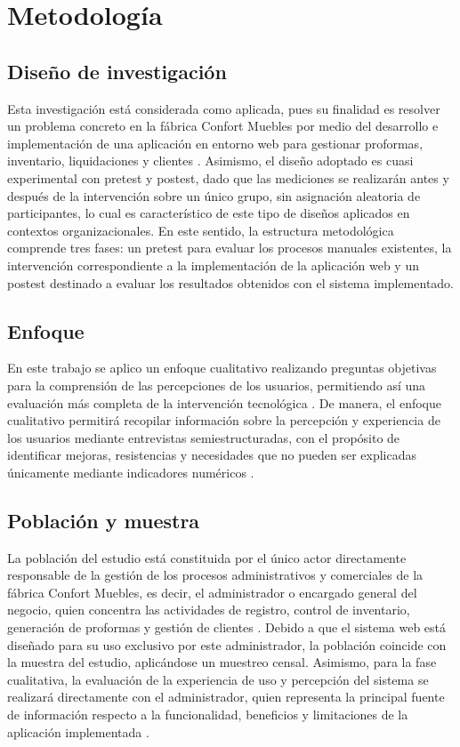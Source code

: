 \chapter{Metodología}

\section{Diseño de investigación}

Esta investigación está considerada como aplicada, pues su finalidad es resolver un problema concreto en la fábrica Confort Muebles por medio del desarrollo e implementación de una aplicación en entorno web para gestionar proformas, inventario, liquidaciones y clientes \parencite{hernandez2018metodologia}. Asimismo, el diseño adoptado es cuasi experimental con pretest y postest, dado que las mediciones se realizarán antes y después de la intervención sobre un único grupo, sin asignación aleatoria de participantes, lo cual es característico de este tipo de diseños aplicados en contextos organizacionales. En este sentido, la estructura metodológica comprende tres fases: un pretest para evaluar los procesos manuales existentes, la intervención correspondiente a la implementación de la aplicación web y un postest destinado a evaluar los resultados obtenidos con el sistema implementado.
\section{Enfoque}

En este trabajo se aplico un enfoque cualitativo realizando preguntas objetivas para la comprensión de las percepciones de los usuarios, permitiendo así una evaluación más completa de la intervención tecnológica \parencite{creswell2019}. De manera, el enfoque cualitativo permitirá recopilar información sobre la percepción y experiencia de los usuarios mediante entrevistas semiestructuradas, con el propósito de identificar mejoras, resistencias y necesidades que no pueden ser explicadas únicamente mediante indicadores numéricos \parencite{flick2021}.
\section{Población y muestra}

La población del estudio está constituida por el único actor directamente responsable de la gestión de los procesos administrativos y comerciales de la fábrica Confort Muebles, es decir, el administrador o encargado general del negocio, quien concentra las actividades de registro, control de inventario, generación de proformas y gestión de clientes \parencite{creswell2019}. Debido a que el sistema web está diseñado para su uso exclusivo por este administrador, la población coincide con la muestra del estudio, aplicándose un muestreo censal. Asimismo, para la fase cualitativa, la evaluación de la experiencia de uso y percepción del sistema se realizará directamente con el administrador, quien representa la principal fuente de información respecto a la funcionalidad, beneficios y limitaciones de la aplicación implementada \parencite{flick2021}.
